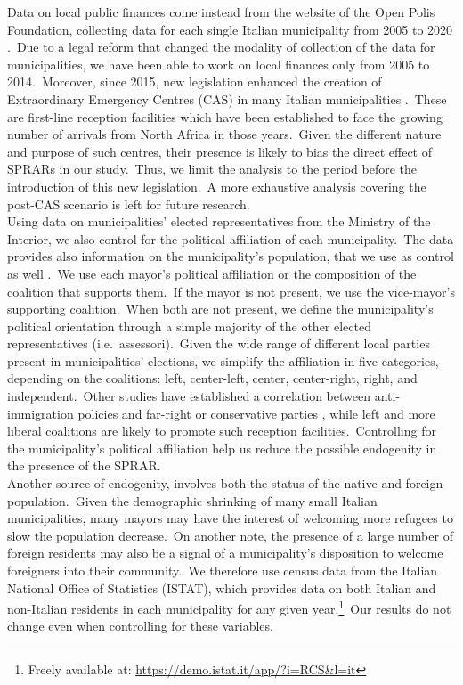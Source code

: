 \documentclass[authoryear,preprint,review,12pt]{elsarticle}
\begin{document}
\noindent
 Data on local public finances come instead from the website of the Open Polis Foundation, collecting data for each single Italian municipality from 2005 to 2020 \citep{openpolis2024}.\ Due to a legal reform that changed the modality of collection of the data for municipalities, we have been able to work on local finances only from 2005 to 2014.\ Moreover, since 2015, new legislation enhanced the creation of Extraordinary Emergency Centres (CAS) in many Italian municipalities \citep{ricardguay2019}.\ These are first-line reception facilities which have been established to face the growing number of arrivals from North Africa in those years.\ Given the different nature and purpose of such centres, their presence is likely to bias the direct effect of SPRARs in our study.\ Thus, we limit the analysis to the period before the introduction of this new legislation.\ A more exhaustive analysis covering the post-CAS scenario is left for future research.\\

 \noindent
 Using data on municipalities' elected representatives from the Ministry of the Interior, we also control for the political affiliation of each municipality.\ The data provides also information on the municipality's population, that we use as control as well \citep{ministerointerno}.\ We use each mayor's political affiliation or the composition of the coalition that supports them.\ If the mayor is not present, we use the vice-mayor's supporting coalition.\ When both are not present, we define the municipality's political orientation through a simple majority of the other elected representatives (i.e.\ assessori).\ Given the wide range of different local parties present in municipalities' elections, we simplify the affiliation in five categories, depending on the coalitions: left, center-left, center, center-right, right, and independent.\ Other studies have established a correlation between anti-immigration policies and far-right or conservative parties \citep{bracco2018}, while left and more liberal coalitions are likely to promote such reception facilities.\ Controlling for the municipality's political affiliation help us reduce the possible endogenity in the presence of the SPRAR.\\ 

\noindent
 Another source of endogenity, involves both the status of the native and foreign population.\ Given the demographic shrinking of many small Italian municipalities, many mayors may have the interest of welcoming more refugees to slow the population decrease.\ On another note, the presence of a large number of foreign residents may also be a signal of a municipality's disposition to welcome foreigners into their community.\ We therefore use census data from the Italian National Office of Statistics (ISTAT), which provides data on both Italian and non-Italian residents in each municipality for any given year.\footnote{Freely available at: \url{https://demo.istat.it/app/?i=RCS&l=it}}\ Our results do not change even when controlling for these variables.\\
\end{document}
